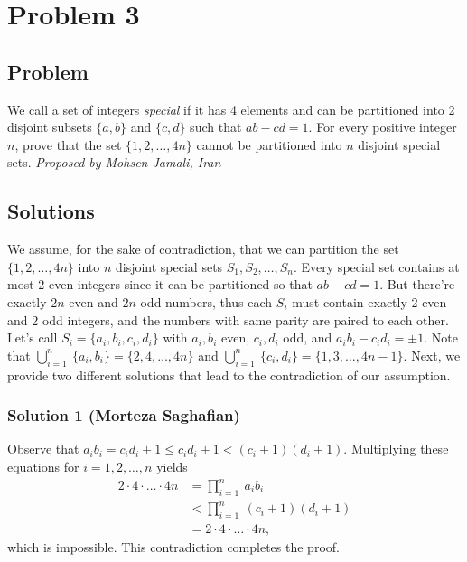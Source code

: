 \section{Problem 3}
\subsection{Problem}
We call a set of integers \textit{special} if it has 4 elements and can be partitioned into 2 disjoint subsets $\{a,b\}$ and $\{c,d\}$ such that $ab-cd=1$. For every positive integer $n$, prove that the set $\{1,2, \ldots , 4n\}$ cannot be partitioned into $n$ disjoint special sets.\nl
\textit{Proposed by Mohsen Jamali, Iran}

\subsection{Solutions}
We assume, for the sake of contradiction, that we can partition the set $\{1,2,\hdots , 4n\}$ into $n$ disjoint special sets $S_1, S_2,\hdots , S_n$. Every special set contains at most 2 even integers since it can be partitioned so that $ab-cd=1$. But there're exactly $2n$ even and $2n$ odd numbers, thus each $S_i$ must contain exactly 2 even and 2 odd integers, and the numbers with same parity are paired to each other. Let's call $S_i=\{a_i, b_i, c_i, d_i\}$ with $a_i,b_i$ even, $c_i,d_i$ odd, and $a_ib_i-c_id_i=\pm 1$.
\nl Note that  $\displaystyle{\bigcup_{i=1}^n\ \{a_i,b_i\}=\{2,4,\hdots , 4n\}}$ and  $\displaystyle{\bigcup_{i=1}^n\ \{c_i,d_i\}=\{1,3,\hdots , 4n-1\}}$.
\nl Next, we provide two different solutions that lead to the contradiction of our assumption.

\subsubsection{Solution 1 (Morteza Saghafian)}
Observe that $a_ib_i=c_id_i\pm 1\leq c_id_i+1<(c_i+1)(d_i+1)$. Multiplying these equations for $i=1,2,\hdots , n$ yields
\begin{align*}
    2\cdot4\cdot \hdots \cdot 4n &= \prod_{i=1}^n\ a_ib_i \\
    &< \prod_{i=1}^n\ (c_i+1)(d_i+1) \\
    &= 2\cdot 4 \cdot \hdots \cdot 4n,
\end{align*} which is impossible. This contradiction completes the proof.

